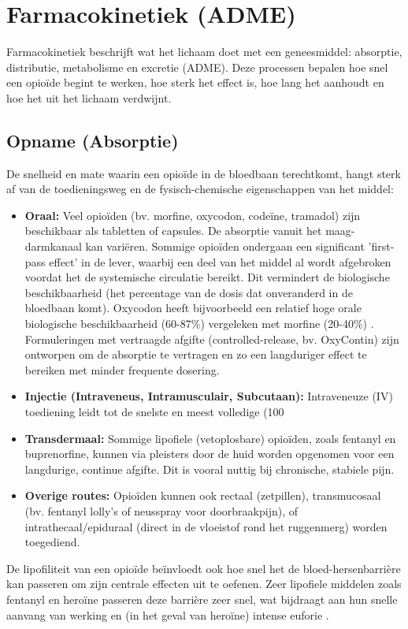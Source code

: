 \documentclass[11pt, a4paper]{report} %
\begin{document}
\section{Farmacokinetiek (ADME)}
Farmacokinetiek beschrijft wat het lichaam doet met een geneesmiddel: absorptie, distributie, metabolisme en excretie (ADME). Deze processen bepalen hoe snel een opioïde begint te werken, hoe sterk het effect is, hoe lang het aanhoudt en hoe het uit het lichaam verdwijnt.

\subsection{Opname (Absorptie)}
De snelheid en mate waarin een opioïde in de bloedbaan terechtkomt, hangt sterk af van de toedieningsweg en de fysisch-chemische eigenschappen van het middel:
\begin{itemize}
    \item \textbf{Oraal:} Veel opioïden (bv. morfine, oxycodon, codeïne, tramadol) zijn beschikbaar als tabletten of capsules. De absorptie vanuit het maag-darmkanaal kan variëren. Sommige opioïden ondergaan een significant 'first-pass effect' in de lever, waarbij een deel van het middel al wordt afgebroken voordat het de systemische circulatie bereikt. Dit vermindert de biologische beschikbaarheid (het percentage van de dosis dat onveranderd in de bloedbaan komt). Oxycodon heeft bijvoorbeeld een relatief hoge orale biologische beschikbaarheid (60-87\%) vergeleken met morfine (20-40\%) \parencite{PubChemOxycodone, SciELO2020Opioids}. Formuleringen met vertraagde afgifte (controlled-release, bv. OxyContin) zijn ontworpen om de absorptie te vertragen en zo een langduriger effect te bereiken met minder frequente dosering.
    \item \textbf{Injectie (Intraveneus, Intramusculair, Subcutaan):} Intraveneuze (IV) toediening leidt tot de snelste en meest volledige (100%
    \item \textbf{Transdermaal:} Sommige lipofiele (vetoplosbare) opioïden, zoals fentanyl en buprenorfine, kunnen via pleisters door de huid worden opgenomen voor een langdurige, continue afgifte. Dit is vooral nuttig bij chronische, stabiele pijn.
    \item \textbf{Overige routes:} Opioïden kunnen ook rectaal (zetpillen), transmucosaal (bv. fentanyl lolly's of neusspray voor doorbraakpijn), of intrathecaal/epiduraal (direct in de vloeistof rond het ruggenmerg) worden toegediend.
\end{itemize}
De lipofiliteit van een opioïde beïnvloedt ook hoe snel het de bloed-hersenbarrière kan passeren om zijn centrale effecten uit te oefenen. Zeer lipofiele middelen zoals fentanyl en heroïne passeren deze barrière zeer snel, wat bijdraagt aan hun snelle aanvang van werking en (in het geval van heroïne) intense euforie \parencite{PubChemfentanyl}.
\end{document}
